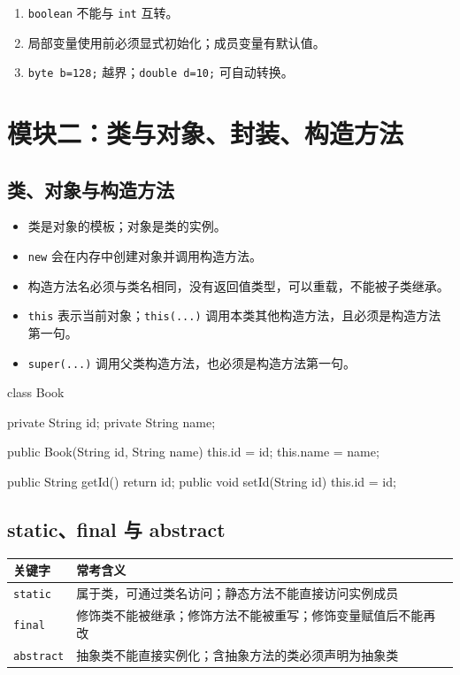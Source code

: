 \documentclass[UTF8,zihao=-4]{ctexart}
\begin{document}
\begin{warnbox}[基础语法易错]
\begin{enumerate}
  \item \texttt{boolean} 不能与 \texttt{int} 互转。
  \item 局部变量使用前必须显式初始化；成员变量有默认值。
  \item \texttt{byte b=128;} 越界；\texttt{double d=10;} 可自动转换。
\end{enumerate}
\end{warnbox}

\section{模块二：类与对象、封装、构造方法}

\subsection{类、对象与构造方法}
\begin{keybox}[核心概念]
\begin{itemize}
  \item 类是对象的模板；对象是类的实例。
  \item \texttt{new} 会在内存中创建对象并调用构造方法。
  \item 构造方法名必须与类名相同，没有返回值类型，可以重载，不能被子类继承。
  \item \texttt{this} 表示当前对象；\texttt{this(...)} 调用本类其他构造方法，且必须是构造方法第一句。
  \item \texttt{super(...)} 调用父类构造方法，也必须是构造方法第一句。
\end{itemize}
\end{keybox}

\begin{methodbox}[封装类书写模板]
\begin{Code}
class Book {
  private String id;
  private String name;

  public Book(String id, String name) {
    this.id = id;
    this.name = name;
  }

  public String getId() { return id; }
  public void setId(String id) { this.id = id; }
}
\end{Code}
\end{methodbox}

\subsection{static、final 与 abstract}
\begin{longtable}{p{}p{}}
\toprule
\textbf{关键字} & \textbf{常考含义} \\
\midrule
\texttt{static} & 属于类，可通过类名访问；静态方法不能直接访问实例成员 \\
\texttt{final} & 修饰类不能被继承；修饰方法不能被重写；修饰变量赋值后不能再改 \\
\texttt{abstract} & 抽象类不能直接实例化；含抽象方法的类必须声明为抽象类 \\
\bottomrule
\end{longtable}
\end{document}
